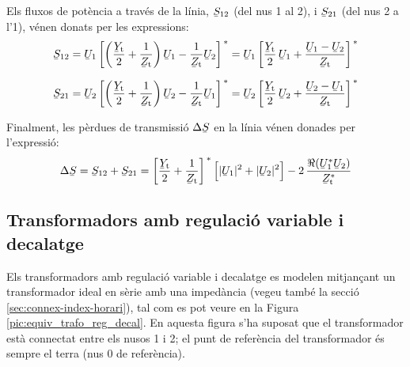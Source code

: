 Els fluxos de potència a través de la línia, $\cmplx{S}_{12}$ (del
nus 1 al 2), i $\cmplx{S}_{21}$ (del nus 2 a l'1), vénen donats per
les expressions:
\begin{align}
   \cmplx{S}_{12} &= \cmplx{U}_1 \left[ \left( \frac{\cmplx{Y}\ped{t}}{2} + \frac{1}{\cmplx{Z}\ped{t}} \right) \cmplx{U}_1 - \frac{1}{\cmplx{Z}\ped{t}} \cmplx{U}_2 \right]^{\,*} = \cmplx{U}_1 \left[ \frac{\cmplx{Y}\ped{t}}{2}\, \cmplx{U}_1 + \frac{\cmplx{U}_1 - \cmplx{U}_2}{\cmplx{Z}\ped{t}} \right]^{\,*} \label{eq:lin_s12}
   \\[1.5ex]
   \cmplx{S}_{21} &= \cmplx{U}_2 \left[ \left( \frac{\cmplx{Y}\ped{t}}{2} + \frac{1}{\cmplx{Z}\ped{t}} \right) \cmplx{U}_2 - \frac{1}{\cmplx{Z}\ped{t}} \cmplx{U}_1 \right]^{\,*} = \cmplx{U}_2 \left[ \frac{\cmplx{Y}\ped{t}}{2} \,\cmplx{U}_2 + \frac{\cmplx{U}_2 - \cmplx{U}_1}{\cmplx{Z}\ped{t}} \right]^{\,*} \label{eq:lin_s21}
\end{align}

Finalment, les pèrdues de transmissió $\Delta\cmplx{S}$ en la  línia vénen donades per
l'expressió:
\begin{equation}
   \Delta\cmplx{S} = \cmplx{S}_{12} + \cmplx{S}_{21} = \left[ \frac{\cmplx{Y}\ped{t}}{2} + \frac{1}{\cmplx{Z}\ped{t}} \right]^{\,*} \Big[ |\cmplx{U}_1|^2 + |\cmplx{U}_2|^2 \Big] - 2 \, \frac{\Re (\cmplx{U}_1^* \cmplx{U}_2)}{\cmplx{Z}\ped{t}^*}
\end{equation}

\subsection{Transformadors amb regulació variable i decalatge}

Els transformadors amb regulació variable i decalatge es modelen
mitjançant un transformador ideal en sèrie amb una impedància
(vegeu també la secció \ref{sec:connex-index-horari}), tal
com es pot veure en la Figura \vref{pic:equiv_trafo_reg_decal}. En
aquesta figura s'ha suposat que el transformador està connectat
entre els nusos 1 i 2; el punt de referència del transformador és
sempre  el terra (nus 0 de referència). 

\begin{center}
    
    \label{pic:equiv_trafo_reg_decal}
\end{center}

